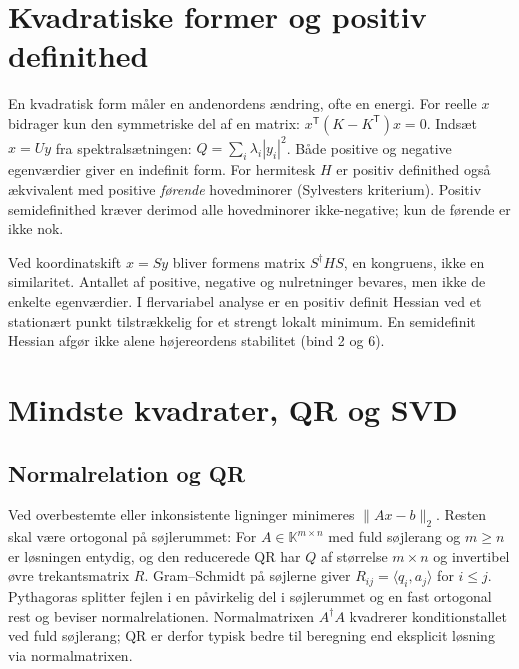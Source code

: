 \section{Kvadratiske former og positiv definithed}
En kvadratisk form måler en andenordens ændring, ofte en energi.
For reelle $x$ bidrager kun den symmetriske del af en matrix:
$x^{\mathsf T}(K-K^{\mathsf T})x=0$.
Indsæt $x=Uy$ fra spektralsætningen: $Q=\sum_i\lambda_i|y_i|^2$.
Både positive og negative egenværdier giver en indefinit form.
For hermitesk $H$ er positiv definithed også ækvivalent med positive
\emph{førende} hovedminorer (Sylvesters kriterium).
Positiv semidefinithed kræver derimod alle hovedminorer ikke-negative;
kun de førende er ikke nok.

Ved koordinatskift $x=Sy$ bliver formens matrix $S^\dagger HS$,
en kongruens, ikke en similaritet. Antallet af positive, negative og
nulretninger bevares, men ikke de enkelte egenværdier.
I flervariabel analyse er en positiv definit Hessian ved et stationært
punkt tilstrækkelig for et strengt lokalt minimum. En semidefinit Hessian
afgør ikke alene højereordens stabilitet (bind 2 og 6).



\section{Mindste kvadrater, QR og SVD}
\subsection{Normalrelation og QR}
Ved overbestemte eller inkonsistente ligninger minimeres
$\|Ax-b\|_2$. Resten skal være ortogonal på søjlerummet:
For $A\in\mathbb K^{m\times n}$ med fuld søjlerang og $m\ge n$ er
løsningen entydig, og den reducerede QR har $Q$ af størrelse $m\times n$
og invertibel øvre trekantsmatrix $R$.
Gram--Schmidt på søjlerne giver $R_{ij}=\langle q_i,a_j\rangle$ for $i\le j$.
Pythagoras splitter fejlen i en påvirkelig del i søjlerummet og en fast
ortogonal rest og beviser normalrelationen. Normalmatrixen
$A^\dagger A$ kvadrerer konditionstallet ved fuld søjlerang; QR er derfor
typisk bedre til beregning end eksplicit løsning via normalmatrixen.

